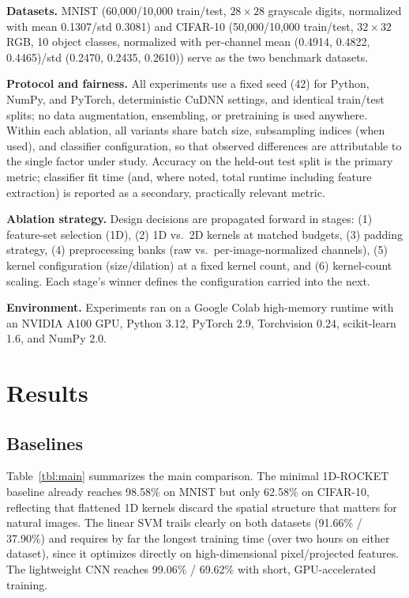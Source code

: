 \documentclass[a4paper,fleqn]{cas-sc}
\begin{document}
\textbf{Datasets.} MNIST (60,000/10,000 train/test, $28\times28$ grayscale digits, normalized with mean 0.1307/std 0.3081) and CIFAR-10 (50,000/10,000 train/test, $32\times32$ RGB, 10 object classes, normalized with per-channel mean (0.4914, 0.4822, 0.4465)/std (0.2470, 0.2435, 0.2610)) serve as the two benchmark datasets.

\textbf{Protocol and fairness.} All experiments use a fixed seed (42) for Python, NumPy, and PyTorch, deterministic CuDNN settings, and identical train/test splits; no data augmentation, ensembling, or pretraining is used anywhere. Within each ablation, all variants share batch size, subsampling indices (when used), and classifier configuration, so that observed differences are attributable to the single factor under study. Accuracy on the held-out test split is the primary metric; classifier fit time (and, where noted, total runtime including feature extraction) is reported as a secondary, practically relevant metric.

\textbf{Ablation strategy.} Design decisions are propagated forward in stages: (1) feature-set selection (1D), (2) 1D vs.\ 2D kernels at matched budgets, (3) padding strategy, (4) preprocessing banks (raw vs.\ per-image-normalized channels), (5) kernel configuration (size/dilation) at a fixed kernel count, and (6) kernel-count scaling. Each stage's winner defines the configuration carried into the next.

\textbf{Environment.} Experiments ran on a Google Colab high-memory runtime with an NVIDIA A100 GPU, Python 3.12, PyTorch 2.9, Torchvision 0.24, scikit-learn 1.6, and NumPy 2.0.

\section{Results}\label{sec:results}

\subsection{Baselines}
Table~\ref{tbl:main} summarizes the main comparison. The minimal 1D-ROCKET baseline already reaches 98.58\% on MNIST but only 62.58\% on CIFAR-10, reflecting that flattened 1D kernels discard the spatial structure that matters for natural images. The linear SVM trails clearly on both datasets (91.66\% / 37.90\%) and requires by far the longest training time (over two hours on either dataset), since it optimizes directly on high-dimensional pixel/projected features. The lightweight CNN reaches 99.06\% / 69.62\% with short, GPU-accelerated training.
\end{document}
